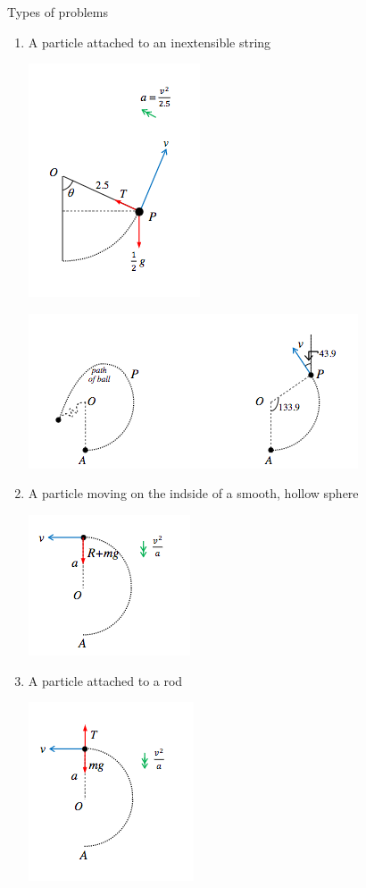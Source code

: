 \documentclass[a4paper]{article}
\begin{document}
Types of problems
\begin{enumerate}
    \item A particle attached to an inextensible string
    \begin{center}
        \includegraphics[scale=0.5]{img_M/13_eg4_1}
    \end{center}
    \begin{center}
        \includegraphics[scale=0.5]{img_M/13_eg4_2}
    \end{center}
	\item A particle moving on the indside of a smooth, hollow sphere
    \begin{center}
        \includegraphics[scale=0.5]{img_M/13_eg5}
    \end{center}
	\item A particle attached to a rod
    \begin{center}
        \includegraphics[scale=0.5]{img_M/13_eg6}

\end{center}
\end{enumerate}
\end{document}
